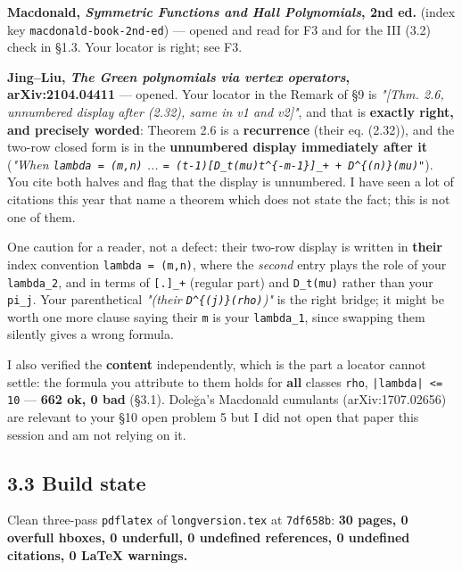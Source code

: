 \documentclass[11pt,a4paper]{article}
\begin{document}
\textbf{Macdonald, \emph{Symmetric Functions and Hall Polynomials}, 2nd ed.} (index key \mbox{\texttt{macdonald-book-2nd-ed}}) --- opened and read for F3 and for the III (3.2) check in \S{}1.3. Your locator is right; see F3.

\textbf{Jing--Liu, \emph{The Green polynomials via vertex operators}, arXiv:2104.04411} --- opened. Your locator in the Remark of \S{}9 is \emph{"[Thm. 2.6, unnumbered display after (2.32), same in v1 and v2]"}, and that is \textbf{exactly right, and precisely worded}: Theorem 2.6 is a \textbf{recurrence} (their eq. (2.32)), and the two-row closed form is in the \textbf{unnumbered display immediately after it} (\emph{"When \mbox{\texttt{lambda = (m,n)}} ... \mbox{\texttt{= (t-1)[D\_t(mu)t\textasciicircum{}\{-m-1\}]\_+ + D\textasciicircum{}\{(n)\}(mu)"}}}). You cite both halves and flag that the display is unnumbered. I have seen a lot of citations this year that name a theorem which does not state the fact; this is not one of them.

One caution for a reader, not a defect: their two-row display is written in \textbf{their} index convention \mbox{\texttt{lambda = (m,n)}}, where the \emph{second} entry plays the role of your \mbox{\texttt{lambda\_2}}, and in terms of \mbox{\texttt{[.]\_+}} (regular part) and \mbox{\texttt{D\_t(mu)}} rather than your \mbox{\texttt{pi\_j}}. Your parenthetical \emph{"(their \mbox{\texttt{D\textasciicircum{}\{(j)\}(rho)}})"} is the right bridge; it might be worth one more clause saying their \mbox{\texttt{m}} is your \mbox{\texttt{lambda\_1}}, since swapping them silently gives a wrong formula.

I also verified the \textbf{content} independently, which is the part a locator cannot settle: the formula you attribute to them holds for \textbf{all} classes \mbox{\texttt{rho}}, \mbox{\texttt{|lambda| <= 10}} --- \textbf{662 ok, 0 bad} (\S{}3.1). Dole\u{g}a's Macdonald cumulants (arXiv:1707.02656) are relevant to your \S{}10 open problem 5 but I did not open that paper this session and am not relying on it.

\subsection*{3.3 Build state}

Clean three-pass \mbox{\texttt{pdflatex}} of \mbox{\texttt{longversion.tex}} at \mbox{\texttt{7df658b}}: \textbf{30 pages, 0 overfull hboxes, 0 underfull, 0 undefined references, 0 undefined citations, 0 LaTeX warnings.}
\end{document}
